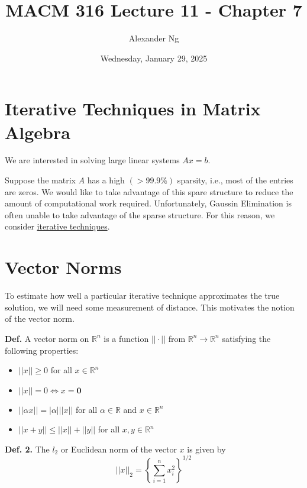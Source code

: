 \documentclass[12pt]{article}
\begin{document}
\renewcommand{\arraystretch}{1.25} %
\setlength{\arraycolsep}{12pt}

\title{MACM 316 Lecture 11 - Chapter 7}
\author{Alexander Ng}
\date{Wednesday, January 29, 2025}

\maketitle

\section{Iterative Techniques in Matrix Algebra}

We are interested in solving large linear systems $Ax=b$.

Suppose the matrix $A$ has a high $(>99.9\%)$ sparsity, i.e., most of the
entries are zeros. We would like to take advantage of this spare structure to
reduce the amount of computational work required. Unfortunately, Gaussin
Elimination is often unable to take advantage of the sparse structure. For this
reason, we consider \uline{iterative techniques}.

\section{Vector Norms}

To estimate how well a particular iterative technique approximates
the true solution, we will need some measurement of distance. This motivates
the notion of the vector norm.

\textbf{Def.} A vector norm on $\mathbb{R}^n$ is a function $||\cdot||$ from
$\mathbb{R}^n \to \mathbb{R}^n $ satisfying the following properties:

\begin{itemize}
  \item $||x|| \geq 0$ for all $x \in \mathbb{R}^n$
  \item $||x|| = 0 \iff x = \mathbf{0}$
  \item $||\alpha x|| = |\alpha| ||x||$ for all $\alpha \in \mathbb{R}$ and
    $x \in \mathbb{R}^n$
  \item $||x+y|| \leq ||x|| + ||y|| $ for all $x,y \in \mathbb{R}^n$
\end{itemize}

\textbf{Def. 2.} The $l_2$ or Euclidean norm of the vector $x$ is given by
\begin{equation*}
  ||x||_2 = \left\{ \sum_{i = 1}^{n}  x_i^2 \right\}^{1/2}
\end{equation*}
\end{document}
